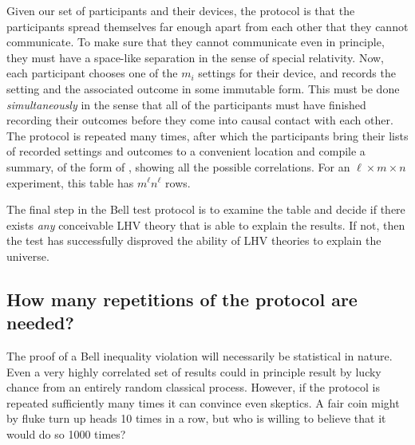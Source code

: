 Given our set of participants and their devices, the protocol is that the participants spread themselves far enough apart from each other that they cannot communicate. To make sure that they cannot communicate even in principle, they must have a space-like separation in the sense of special relativity. Now, each participant chooses one of the $m_i$ settings for their device, and records the setting and the associated outcome in some immutable form. This must be done \emph{simultaneously} in the sense that all of the participants must have finished recording their outcomes before they come into causal contact with each other. The protocol is repeated many times, after which the participants bring their lists of recorded settings and outcomes to a convenient location and compile a summary, of the form of , showing all the possible correlations. For an $\ell\times m\times n$ experiment, this table has $m^\ell n^\ell$ rows.

The final step in the Bell test protocol is to examine the table and decide if there exists \emph{any} conceivable LHV theory that is able to explain the results. If not, then the test has successfully disproved the ability of LHV theories to explain the universe.

\subsection{How many repetitions of the protocol are needed?}\label{sec:reps}
The proof of a Bell inequality violation will necessarily be statistical in nature. Even a very highly correlated set of results could in principle result by lucky chance from an entirely random classical process. However, if the protocol is repeated sufficiently many times it can convince even skeptics. A fair coin might by fluke turn up heads 10 times in a row, but who is willing to believe that it would do so 1000 times?

